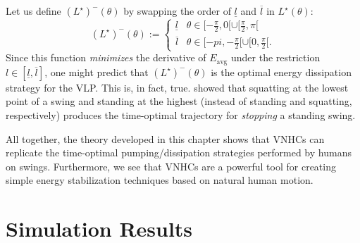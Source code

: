 Let us define \((L^\star)^{-}(\theta)\) by swapping the order of 
\(\underline{l}\) and \(\overline{l}\) in \(L^\star(\theta)\): 
\[
   (L^\star)^-(\theta) := \begin{cases}
      \underline{l} & \theta \in [-\frac{\pi}{2},0[ \cup [\frac{\pi}{2}, \pi[ \\
      \overline{l} & \theta \in [-pi, -\frac{\pi}{2}[ \cup [0,\frac{\pi}{2}[ 
      .
   \end{cases}
\]
Since this function \textit{minimizes} the derivative of \(E_\text{avg}\) under
the restriction \(l \in [\underline{l},\overline{l}]\), one might predict that 
\((L^\star)^{-}(\theta)\) is the optimal energy dissipation strategy for the VLP.
This is, in fact, true. \citet{pumping_swing_standing_squatting} showed 
that squatting at the lowest point of a swing and standing at the highest
(instead of standing and squatting, respectively) produces the
time-optimal trajectory for \textit{stopping} a standing swing. 

All together, the theory developed in this chapter shows that VNHCs can
replicate the time-optimal pumping/dissipation strategies performed by humans on
swings.
Furthermore, we see that VNHCs are a powerful tool for creating simple energy
stabilization techniques based on natural human motion.

\section{Simulation Results}

